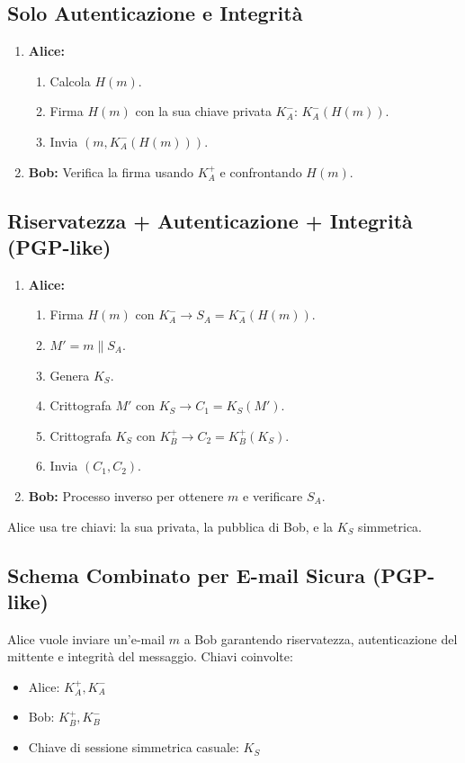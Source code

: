 \subsection{Solo Autenticazione e Integrità}
\begin{enumerate}
    \item \textbf{Alice:}
    \begin{enumerate}
        \item Calcola $H(m)$.
        \item Firma $H(m)$ con la sua chiave privata $K_A^-$: $K_A^-(H(m))$.
        \item Invia $(m, K_A^-(H(m)))$.
    \end{enumerate}
    \item \textbf{Bob:}
    Verifica la firma usando $K_A^+$ e confrontando $H(m)$.
\end{enumerate}

\subsection{Riservatezza + Autenticazione + Integrità (PGP-like)}
\begin{enumerate}
    \item \textbf{Alice:}
    \begin{enumerate}
        \item Firma $H(m)$ con $K_A^- \rightarrow S_A = K_A^-(H(m))$.
        \item $M' = m \mathbin{\|} S_A$.
        \item Genera $K_S$.
        \item Crittografa $M'$ con $K_S \rightarrow C_1 = K_S(M')$.
        \item Crittografa $K_S$ con $K_B^+ \rightarrow C_2 = K_B^+(K_S)$.
        \item Invia $(C_1, C_2)$.
    \end{enumerate}
    \item \textbf{Bob:}
    Processo inverso per ottenere $m$ e verificare $S_A$.
\end{enumerate}
Alice usa tre chiavi: la sua privata, la pubblica di Bob, e la $K_S$ simmetrica.

\subsection{Schema Combinato per E-mail Sicura (PGP-like)}
\label{ssec:email_pgp_like}
Alice vuole inviare un'e-mail $m$ a Bob garantendo riservatezza, autenticazione del mittente e integrità del messaggio.
Chiavi coinvolte:
\begin{itemize}
    \item Alice: $K_A^+, K_A^-$
    \item Bob: $K_B^+, K_B^-$
    \item Chiave di sessione simmetrica casuale: $K_S$
\end{itemize}

